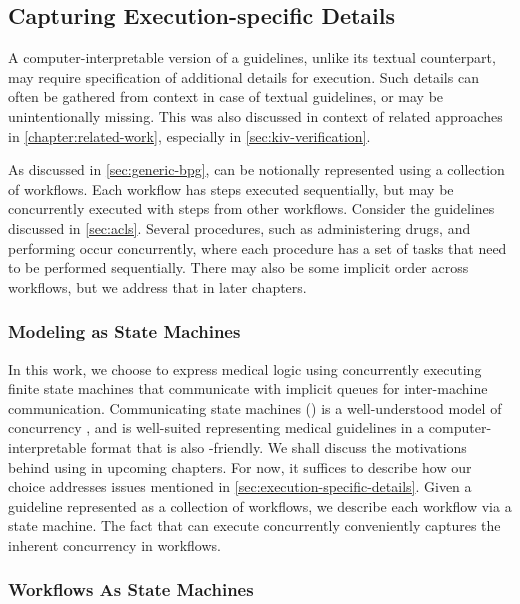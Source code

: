 \subsection{Capturing Execution-specific Details}\label{sec:execution-specific-details}

A computer-interpretable version of a guidelines, unlike its
textual counterpart, may require specification of additional details
for execution. Such details can often be gathered from context in case
of textual guidelines, or may be unintentionally missing. This was also
discussed in context of related approaches in \autoref{chapter:related-work},
especially in \autoref{sec:kiv-verification}.

As discussed in \autoref{sec:generic-bpg}, \BPGs{} can be notionally
represented using a collection of workflows. Each workflow has steps
executed sequentially, but may be concurrently executed with steps from
other workflows. Consider the \ACLS{} guidelines discussed in
\autoref{sec:acls}. Several procedures, such as administering drugs,
and performing \CPR{} occur concurrently, where each procedure has
a set of tasks that need to be performed sequentially.
There may also be some implicit order across workflows, but we
address that in later chapters.

\subsubsection{Modeling \BPGs{} as State Machines}

In this work, we choose to express medical logic using
concurrently executing finite state machines that communicate
with implicit queues for inter-machine communication. Communicating
state machines (\CSMs{}) is a well-understood model of concurrency
\cite{BrandJACM83}, and is well-suited  representing medical guidelines in a
computer-interpretable format that is also \HCP{}-friendly.
We shall discuss the motivations behind using \CSMs{} in upcoming
chapters. For now, it suffices to describe how our choice addresses
issues mentioned in \autoref{sec:execution-specific-details}.
Given a guideline represented as a collection of workflows, we
describe each workflow via a state machine. The fact that
\CSMs{} can execute concurrently conveniently captures the
inherent concurrency in workflows.

\subsubsection{\ACLS{} Workflows As State Machines}

